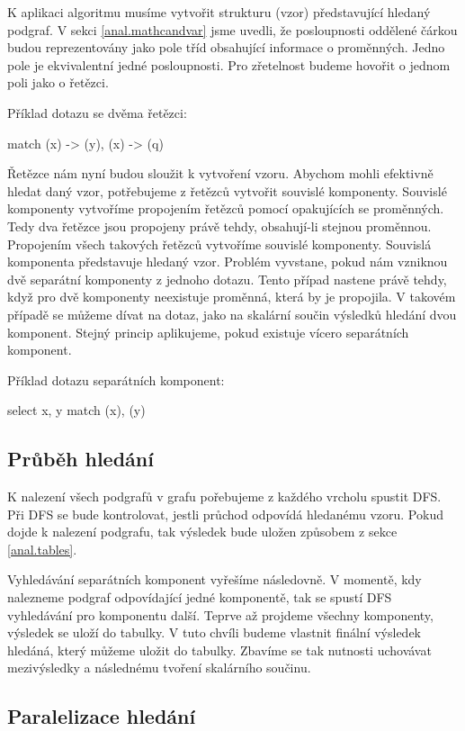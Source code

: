 K aplikaci algoritmu musíme vytvořit strukturu (vzor) představující hledaný podgraf.
V sekci \ref{anal.mathcandvar} jsme uvedli, že posloupnosti oddělené čárkou budou reprezentovány jako pole tříd obsahující informace o proměnných.
Jedno pole je ekvivalentní jedné posloupnosti.
Pro zřetelnost budeme hovořit o jednom poli jako o řetězci.

Příklad dotazu se dvěma řetězci:
\begin{code}
match (x) -> (y), (x) -> (q)
\end{code}

Řetězce nám nyní budou sloužit k vytvoření vzoru.
Abychom mohli efektivně hledat daný vzor, potřebujeme z řetězců vytvořit souvislé komponenty.
Souvislé komponenty vytvoříme propojením řetězců pomocí opakujících se proměnných.
Tedy dva řetězce jsou propojeny právě tehdy, obsahují-li stejnou proměnnou. 
Propojením všech takových řetězců vytvoříme souvislé komponenty.
Souvislá komponenta představuje hledaný vzor.
Problém vyvstane, pokud nám vzniknou dvě separátní komponenty z jednoho dotazu.
Tento případ nastene právě tehdy, když pro dvě komponenty neexistuje proměnná, která by je propojila.
V takovém případě se můžeme dívat na dotaz, jako na skalární součin výsledků hledání dvou komponent.
Stejný princip aplikujeme, pokud existuje vícero separátních komponent.

Příklad dotazu separátních komponent:
\begin{code}
select x, y match (x), (y)
\end{code}

\subsection{Průběh hledání}

K nalezení všech podgrafů v grafu pořebujeme z každého vrcholu spustit DFS.
Při DFS se bude kontrolovat, jestli průchod odpovídá hledanému vzoru.
Pokud dojde k nalezení podgrafu, tak výsledek bude uložen způsobem z sekce \ref{anal.tables}.

Vyhledávání separátních komponent vyřešíme následovně.
V momentě, kdy nalezneme podgraf odpovídající jedné komponentě, tak se spustí DFS vyhledávání pro komponentu další.
Teprve až projdeme všechny komponenty, výsledek se uloží do tabulky.
V tuto chvíli budeme vlastnit finální výsledek hledáná, který můžeme uložit do tabulky.
Zbavíme se tak nutnosti uchovávat mezivýsledky a následnému tvoření skalárního součinu.

\subsection{Paralelizace hledání}

